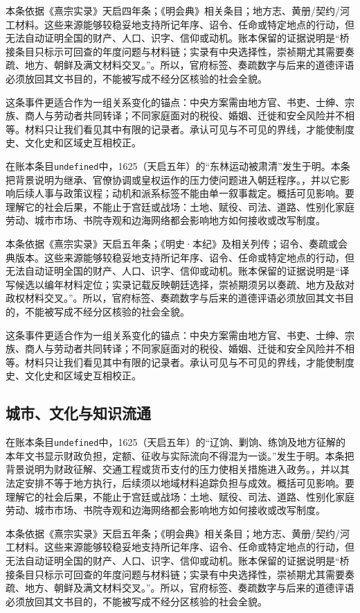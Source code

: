 本条依据《熹宗实录》天启四年条；《明会典》相关条目；地方志、黄册/契约/河工材料。这些来源能够较稳妥地支持所记年序、诏令、任命或特定地点的行动，但无法自动证明全国的财产、人口、识字、信仰或动机。账本保留的证据说明是“桥接条目只标示可回查的年度问题与材料链；实录有中央选择性，崇祯期尤其需要奏疏、地方、朝鲜及满文材料交叉。”。所以，官府标签、奏疏数字与后来的道德评语必须放回其文书目的，不能被写成不经分区核验的社会全貌。

这条事件更适合作为一组关系变化的锚点：中央方案需由地方官、书吏、士绅、宗族、商人与劳动者共同转译；不同家庭面对的税役、婚姻、迁徙和安全风险并不相等。材料只让我们看见其中有限的记录者。承认可见与不可见的界线，才能使制度史、文化史和区域史互相校正。

在账本条目\texttt{undefined}中，1625（天启五年）的“东林运动被肃清”发生于明。本条把背景说明为继承、官僚协调或皇权运作的压力使问题进入朝廷程序。，并以它影响后续人事与政策议程；动机和派系标签不能由单一叙事裁定。概括可见影响。要理解它的社会后果，不能止于宫廷或战场：土地、赋役、司法、道路、性别化家庭劳动、城市市场、书院寺观和边海网络都会影响地方如何接收或改写制度。

本条依据《熹宗实录》天启五年条；《明史·本纪》及相关列传；诏令、奏疏或会典版本。这些来源能够较稳妥地支持所记年序、诏令、任命或特定地点的行动，但无法自动证明全国的财产、人口、识字、信仰或动机。账本保留的证据说明是“译写候选以编年材料定位；实录记载反映朝廷选择，崇祯期须另以奏疏、地方及敌对政权材料交叉。”。所以，官府标签、奏疏数字与后来的道德评语必须放回其文书目的，不能被写成不经分区核验的社会全貌。

这条事件更适合作为一组关系变化的锚点：中央方案需由地方官、书吏、士绅、宗族、商人与劳动者共同转译；不同家庭面对的税役、婚姻、迁徙和安全风险并不相等。材料只让我们看见其中有限的记录者。承认可见与不可见的界线，才能使制度史、文化史和区域史互相校正。

\subsection{城市、文化与知识流通}

在账本条目\texttt{undefined}中，1625（天启五年）的“辽饷、剿饷、练饷及地方征解的本年文书显示财政负担，定额、征收与实际流向不得混为一谈。”发生于明。本条把背景说明为财政征解、交通工程或货币支付的压力使相关措施进入政务。，并以其法定安排不等于地方执行，后续须以地域材料追踪负担与成效。概括可见影响。要理解它的社会后果，不能止于宫廷或战场：土地、赋役、司法、道路、性别化家庭劳动、城市市场、书院寺观和边海网络都会影响地方如何接收或改写制度。

本条依据《熹宗实录》天启五年条；《明会典》相关条目；地方志、黄册/契约/河工材料。这些来源能够较稳妥地支持所记年序、诏令、任命或特定地点的行动，但无法自动证明全国的财产、人口、识字、信仰或动机。账本保留的证据说明是“桥接条目只标示可回查的年度问题与材料链；实录有中央选择性，崇祯期尤其需要奏疏、地方、朝鲜及满文材料交叉。”。所以，官府标签、奏疏数字与后来的道德评语必须放回其文书目的，不能被写成不经分区核验的社会全貌。

